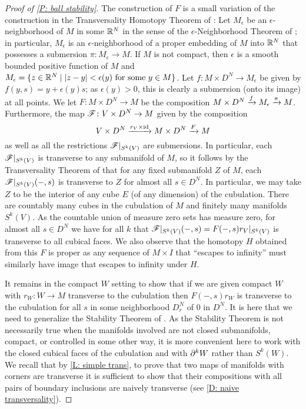 \begin{proof}[Proof of \cref{P: ball stability}]
	The construction of $F$ is a small variation of the construction in the Transversality Homotopy Theorem of \cite[Section 2.3]{GuPo74}:
	Let $M_\epsilon$ be an $\epsilon$-neighborhood of $M$ in some $\mathbb{R}^N$ in the sense of the $\epsilon$-Neighborhood Theorem of \cite[Section 2.3]{GuPo74}; in particular,
	$M_\epsilon$ is an $\epsilon$-neighborhood of a proper embedding of $M$ into $\mathbb{R}^N$ that possesses a submersion $\pi \colon M_\epsilon \to M$.
	If $M$ is not compact, then $\epsilon$ is a smooth bounded positive function of $M$ and $M_\epsilon = \{z \in \mathbb{R}^N \mid |z-y|<\epsilon(y) \text{ for some }y \in M\}$.
	Let $f \colon M \times D^N \to M_\epsilon$ be given by $f(y, s) = y + \epsilon(y) s$; as $\epsilon(y)>0$, this is clearly a submersion (onto its image) at all points.
	We let $F \colon M \times D^N \to M$ be the composition $M \times D^N \xrightarrow{f}M_\epsilon \xrightarrow{\pi}M$.
	Furthermore, the map $\mathscr{F} \colon V \times D^N \to M$ given by the composition $$V \times D^N \xrightarrow{r_V \times \mathrm{id}} M \times D^N \xrightarrow{F} M$$ as well as all the restrictions $\mathscr{F}|_{S^k(V)}$
	are submersions.
	In particular, each $\mathscr{F}|_{S^k(V)}$ is transverse to any submanifold of $M$, so it follows by the Transversality Theorem of \cite[Section 2.3]{GuPo74} that for any fixed submanifold $Z$ of $M$, each $\mathscr{F}|_{S^k(V)}(-,s)$ is transverse to $Z$ for almost all $s \in D^N$.
	In particular, we may take $Z$ to be the interior of any cube $E$ (of any dimension) of the cubulation.
	There are countably many cubes in the cubulation of $M$ and finitely many manifolds $S^k(V)$.
	As the countable union of measure zero sets has measure zero, for almost all $s \in D^N$ we have for all $k$ that $\mathscr{F}|_{S^k(V)}(-,s) = F(-,s)r_V|_{S^k(V)}$ is transverse to all cubical faces.
	We also observe that the homotopy $H$ obtained from this $F$ is proper as any sequence of $M \times I$ that ``escapes to infinity'' must similarly have image that escapes to infinity under $H$.


	It remains in the compact $W$ setting to show that if we are given compact $W$ with $r_W \colon W \to M$ transverse to the cubulation then $F(-,s)r_W$ is transverse to the cubulation for all $s$ in some neighborhood $D_r^N$ of $0$ in $D^N$.
	It is here that we need to generalize the Stability Theorem of \cite[Section 1.6]{GuPo74}.
	As the Stability Theorem is not necessarily true when the manifolds involved are not closed submanifolds, compact, or controlled in some other way, it is more convenient here to work with the closed cubical faces of the cubulation and with $\partial^kW$ rather than $S^k(W)$.
	We recall that by \cref{L: simple trans}, to prove that two maps of manifolds with corners are transverse it is sufficient to show that their compositions with all pairs of boundary inclusions are naively transverse (see \cref{D: naive transversality}).


\end{proof}
